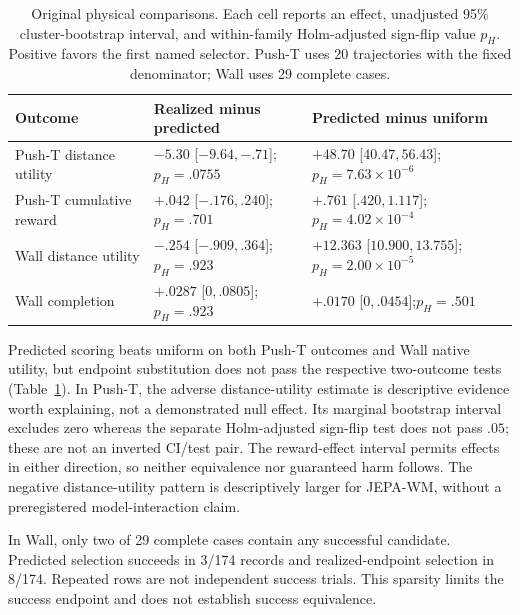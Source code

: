 \documentclass{article}
\begin{document}
\begin{table}[t]
\centering\small
\caption{Original physical comparisons. Each cell reports an effect,
unadjusted 95\% cluster-bootstrap interval, and within-family Holm-adjusted
sign-flip value $p_H$. Positive favors the first named selector. Push-T uses
20 trajectories with the fixed denominator; Wall uses 29 complete cases.}
\label{tab:effects}
\begin{tabular}{@{}p{.18\linewidth}p{.37\linewidth}p{.37\linewidth}@{}}
\toprule
Outcome & Realized minus predicted & Predicted minus uniform\\
\midrule
\raggedright Push-T distance utility & $-5.30$ [$-9.64,-.71$];\newline $p_H=.0755$
 & $+48.70$ [$40.47,56.43$];\newline $p_H=7.63\!\times\!10^{-6}$\\
\raggedright Push-T cumulative reward & $+.042$ [$-.176,.240$];\newline $p_H=.701$
 & $+.761$ [$.420,1.117$];\newline $p_H=4.02\!\times\!10^{-4}$\\
\raggedright Wall distance utility & $-.254$ [$-.909,.364$];\newline $p_H=.923$
 & $+12.363$ [$10.900,13.755$];\newline $p_H=2.00\!\times\!10^{-5}$\\
\raggedright Wall completion & $+.0287$ [$0,.0805$];\newline $p_H=.923$
 & $+.0170$ [$0,.0454$];\newline $p_H=.501$\\
\bottomrule
\end{tabular}
\end{table}

Predicted scoring beats uniform on both Push-T outcomes and Wall native
utility, but endpoint substitution does not pass the respective two-outcome
tests (Table~\ref{tab:effects}). In Push-T, the adverse distance-utility estimate is
descriptive evidence worth explaining, not a demonstrated null effect. Its
marginal bootstrap interval excludes zero whereas the separate Holm-adjusted
sign-flip test does not pass $.05$; these are not an inverted CI/test pair.
The reward-effect interval permits effects in either direction, so neither equivalence
nor guaranteed harm follows. The negative distance-utility pattern is descriptively larger
for JEPA-WM, without a preregistered model-interaction claim.

In Wall, only two of 29 complete cases contain any successful candidate.
Predicted selection succeeds in 3/174 records and realized-endpoint selection
in 8/174. Repeated rows are not
independent success trials. This sparsity limits the success endpoint and
does not establish success equivalence.
\end{document}
